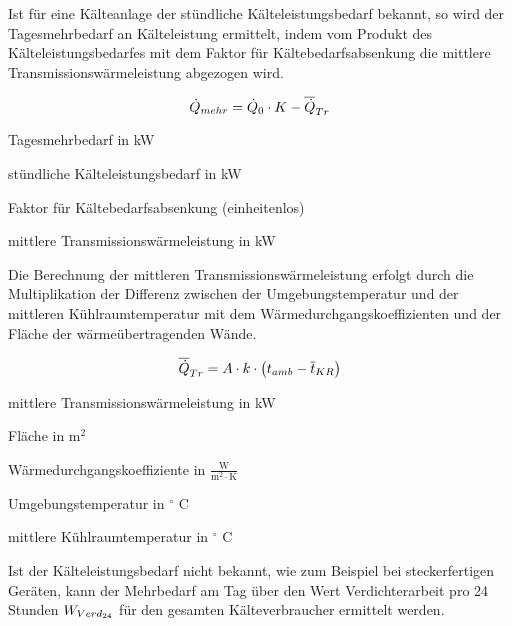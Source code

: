 Ist f\"ur eine K\"alteanlage der st\"undliche K\"alteleistungsbedarf bekannt, so
wird der Tagesmehrbedarf an K\"alteleistung ermittelt, indem vom Produkt des
K\"alteleistungsbedarfes mit dem Faktor f\"ur K\"altebedarfsabsenkung die
mittlere Transmissionswärmeleistung abgezogen wird.

\begin{equation}
	\pmehr = \pkalt \cdot K - \aptrans
\label{pmehr}
\end{equation}

\begin{description}[\dth]

	\item[$\pmehr$] Tagesmehrbedarf in kW
	\item[$\pkalt$] st\"undliche Kälteleistungsbedarf in kW
	\item[$K$] Faktor für Kältebedarfsabsenkung (einheitenlos)
	\item[$\aptrans$] mittlere Transmissionswärmeleistung in kW

\end{description}
\vspace{0.5cm}

Die Berechnung der mittleren Transmissionswärmeleistung erfolgt durch die
Multiplikation der Differenz zwischen der Umgebungstemperatur und der mittleren
Kühlraumtemperatur mit dem Wärmedurchgangskoeffizienten und der Fläche der
wärmeübertragenden Wände.

\begin{equation}
	\aptrans = A \cdot k \cdot \left( t_{amb} -
	\overline{t}_{KR} \right)
	\label{aptrans}
\end{equation}

\begin{description}[\dth]

	\item[$\aptrans$] mittlere Transmissionswärmeleistung in kW
	\item[$A$] Fläche in $\mathrm{m^2}$
	\item[$k$] Wärmedurchgangskoeffiziente in $\mathrm{\frac{W}{m^2 \cdot K}}$
	\item[$t_{amb}$] Umgebungstemperatur in $^{\circ}$ C
	\item[$\overline{t}_{KR}$] mittlere Kühlraumtemperatur in
		$^{\circ}$ C
\end{description}
\vspace{0.5cm}

Ist der Kälteleistungsbedarf nicht bekannt, wie zum Beispiel bei steckerfertigen
Geräten, kann der Mehrbedarf am Tag \"uber den Wert Verdichterarbeit pro 24
Stunden ${W}_{Verd_{24}}$ für den gesamten Kälteverbraucher ermittelt werden.

